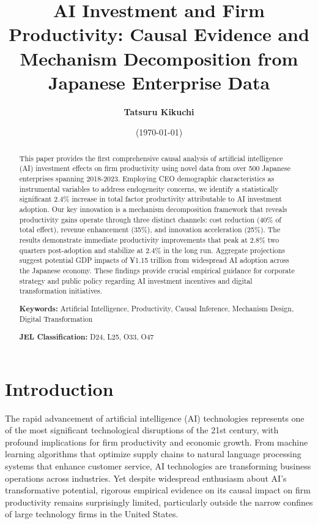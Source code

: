 \documentclass[12pt, a4paper]{article}
\title{\large{\bf{
AI Investment and Firm Productivity: Causal Evidence and Mechanism Decomposition from Japanese Enterprise Data
}}}
\author{\large{\bf{Tatsuru Kikuchi}}}
\affil{\small{\it{Faculty of Economics, The University of Tokyo,}}\\
{\it{7-3-1 Hongo, Bunkyo-ku, Tokyo 113-0033 Japan}}}
\date{\small{(\today)}}
\begin{document}
\maketitle
\begin{abstract}
This paper provides the first comprehensive causal analysis of artificial intelligence (AI) investment effects on firm productivity using novel data from over 500 Japanese enterprises spanning 2018-2023. Employing CEO demographic characteristics as instrumental variables to address endogeneity concerns, we identify a statistically significant 2.4\% increase in total factor productivity attributable to AI investment adoption. Our key innovation is a mechanism decomposition framework that reveals productivity gains operate through three distinct channels: cost reduction (40\% of total effect), revenue enhancement (35\%), and innovation acceleration (25\%). The results demonstrate immediate productivity improvements that peak at 2.8\% two quarters post-adoption and stabilize at 2.4\% in the long run. Aggregate projections suggest potential GDP impacts of ¥1.15 trillion from widespread AI adoption across the Japanese economy. These findings provide crucial empirical guidance for corporate strategy and public policy regarding AI investment incentives and digital transformation initiatives.

\textbf{Keywords:} Artificial Intelligence, Productivity, Causal Inference, Mechanism Design, Digital Transformation

\textbf{JEL Classification:} D24, L25, O33, O47
\end{abstract}

\newpage

\section{Introduction}

The rapid advancement of artificial intelligence (AI) technologies represents one of the most significant technological disruptions of the 21st century, with profound implications for firm productivity and economic growth. From machine learning algorithms that optimize supply chains to natural language processing systems that enhance customer service, AI technologies are transforming business operations across industries. Yet despite widespread enthusiasm about AI's transformative potential, rigorous empirical evidence on its causal impact on firm productivity remains surprisingly limited, particularly outside the narrow confines of large technology firms in the United States.
\end{document}
